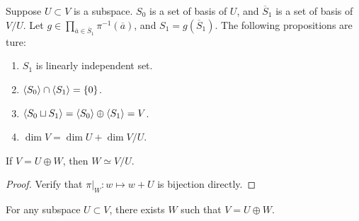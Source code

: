\begin{theorem}
    \label{theorem 3.4.6}
    Suppose $U \subset V$ is a subspace. $S_0$ is a set of basis of $U$, and $\overline{S}_1$ is a set of basis of $V / U$. Let $g \in \prod_{\overline{a} \in \overline{S}_1} \pi^{-1}(\overline{a})$, and $S_1 = g(\overline{S}_1)$. The following propositions are ture:
    \begin{enumerate}
        \item $S_1$ is linearly independent set.
        \item $\langle S_0 \rangle \cap \langle S_1 \rangle = \{ 0 \}$.
        \item $\langle S_0 \sqcup S_1 \rangle = \langle S_0 \rangle \oplus \langle S_1 \rangle = V$.
        \item $\dim V = \dim U + \dim V/U$.
    \end{enumerate}
\end{theorem}



\begin{corollary}
    If $V = U \oplus W$, then $W \simeq V / U$.
\end{corollary}
\begin{proof}
    Verify that $\pi|_{W}: w \mapsto w + U$ is bijection directly.
\end{proof}



\begin{corollary}
    For any subspace $U \subset V$, there exists $W$ such that $V = U \oplus W$.
\end{corollary}




